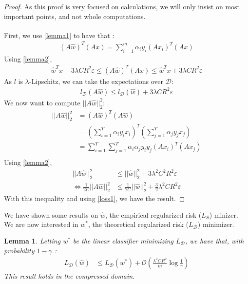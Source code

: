 \documentclass{article}
\newtheorem{lemma}[theorem]{Lemma}
\begin{document}
    \begin{proof}
        As this proof is very focused on calculations, we will only insist on 
        most important points, and not whole computations. \\ \\
        First, we use \ref{lemma1} to have that :
        \begin{align*}
            (A\hat{w})^T(Ax)  = \sum_{i=1}^m \alpha_i y_i (A x_i)^T(Ax)
        \end{align*}
        Using \ref{lemma2}, 
        \begin{align*}
            \hat{w}^Tx - 3\lambda CR^2\varepsilon 
            \leq (A\hat{w})^T(Ax) 
            \leq \hat{w}^Tx + 3\lambda CR^2\varepsilon 
        \end{align*}
        As $l$ is $\lambda$-Lipschitz, we can take the expectations over $\mathcal{D}$:
        \begin{align} \label{loss1}
            l_{\mathcal{D}}(A \hat{w}) \leq l_{\mathcal{D}}(\hat{w}) +  3\lambda CR^2\varepsilon
        \end{align}
        We now want to compute $||A\hat{w}||_2^2 $:
        \begin{align*}
            ||A\hat{w}||_2^2  &= 
                (A\hat{w})^T(A\hat{w}) \\
                &=(\sum_{i=1}^T\alpha_i y_i x_i)^T
                (\sum_{j=1}^T\alpha_j y_j x_j) \\
                &= \sum_{i=1}^T \sum_{j=1}^T 
                \alpha_i \alpha_j  
                y_i y_j
                (Ax_i)^T (Ax_j) \\
        \end{align*}
        Using \ref{lemma2}, 
        \begin{align*}
            ||A\hat{w}||_2^2  &\leq ||\hat{w}||_2^2 + 3 \lambda^2 C^2 R^2 \varepsilon \\
            \Leftrightarrow \frac{1}{2C}||A\hat{w}||_2^2  &\leq\frac{1}{2C} ||\hat{w}||_2^2 + \frac{3}{2} \lambda^2 C R^2 \varepsilon 
        \end{align*}
        With this inequality and using \ref{loss1}, we have the result.
    \end{proof}
    We have shown some results on $\hat{w}$, the empirical regularized
    risk ($L_S$) minizer. We are now interested in $w^*$, the theoretical regularized
    risk ($L_\mathcal{D}$) minimizer. 
    \begin{lemma} \label{lemma4}
        Letting $w^*$ be the linear classifier minimizing 
        $L_\mathcal{D}$, we have that, with probability $1-\gamma$ : 
        \begin{align*}
            L_\mathcal{D}(\hat{w}) 
            &\leq L_\mathcal{D}(w^*) 
            + \mathcal{O}\left (\frac{\lambda^2 C R^2}{m}\log \frac{1}{\gamma} \right )
        \end{align*}
    This result holds in the compressed domain.
    \end{lemma}
\end{document}
